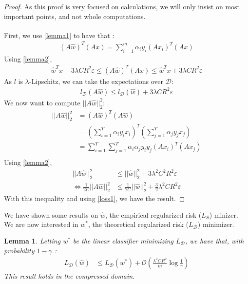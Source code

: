 \documentclass{article}
\newtheorem{lemma}[theorem]{Lemma}
\begin{document}
    \begin{proof}
        As this proof is very focused on calculations, we will only insist on 
        most important points, and not whole computations. \\ \\
        First, we use \ref{lemma1} to have that :
        \begin{align*}
            (A\hat{w})^T(Ax)  = \sum_{i=1}^m \alpha_i y_i (A x_i)^T(Ax)
        \end{align*}
        Using \ref{lemma2}, 
        \begin{align*}
            \hat{w}^Tx - 3\lambda CR^2\varepsilon 
            \leq (A\hat{w})^T(Ax) 
            \leq \hat{w}^Tx + 3\lambda CR^2\varepsilon 
        \end{align*}
        As $l$ is $\lambda$-Lipschitz, we can take the expectations over $\mathcal{D}$:
        \begin{align} \label{loss1}
            l_{\mathcal{D}}(A \hat{w}) \leq l_{\mathcal{D}}(\hat{w}) +  3\lambda CR^2\varepsilon
        \end{align}
        We now want to compute $||A\hat{w}||_2^2 $:
        \begin{align*}
            ||A\hat{w}||_2^2  &= 
                (A\hat{w})^T(A\hat{w}) \\
                &=(\sum_{i=1}^T\alpha_i y_i x_i)^T
                (\sum_{j=1}^T\alpha_j y_j x_j) \\
                &= \sum_{i=1}^T \sum_{j=1}^T 
                \alpha_i \alpha_j  
                y_i y_j
                (Ax_i)^T (Ax_j) \\
        \end{align*}
        Using \ref{lemma2}, 
        \begin{align*}
            ||A\hat{w}||_2^2  &\leq ||\hat{w}||_2^2 + 3 \lambda^2 C^2 R^2 \varepsilon \\
            \Leftrightarrow \frac{1}{2C}||A\hat{w}||_2^2  &\leq\frac{1}{2C} ||\hat{w}||_2^2 + \frac{3}{2} \lambda^2 C R^2 \varepsilon 
        \end{align*}
        With this inequality and using \ref{loss1}, we have the result.
    \end{proof}
    We have shown some results on $\hat{w}$, the empirical regularized
    risk ($L_S$) minizer. We are now interested in $w^*$, the theoretical regularized
    risk ($L_\mathcal{D}$) minimizer. 
    \begin{lemma} \label{lemma4}
        Letting $w^*$ be the linear classifier minimizing 
        $L_\mathcal{D}$, we have that, with probability $1-\gamma$ : 
        \begin{align*}
            L_\mathcal{D}(\hat{w}) 
            &\leq L_\mathcal{D}(w^*) 
            + \mathcal{O}\left (\frac{\lambda^2 C R^2}{m}\log \frac{1}{\gamma} \right )
        \end{align*}
    This result holds in the compressed domain.
    \end{lemma}
\end{document}
